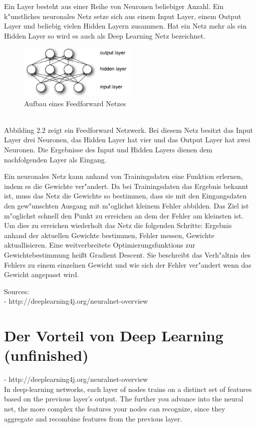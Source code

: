 {Ein Layer besteht aus einer Reihe von Neuronen beliebiger Anzahl. Ein k"unstliches neuronales Netz setze sich aus einem Input Layer, einem Output Layer und beliebig vielen Hidden Layern zusammen. Hat ein Netz mehr als ein Hidden Layer so wird es auch als Deep Learning Netz bezeichnet.
\renewcommand{\figurename}{Abb.}
\begin{figure}[htp]
\centering
\includegraphics[width=0.50\textwidth]{pictures/mlp.png}
\caption[Aufbau eines Feedforward Netzes]{Aufbau eines Feedforward Netzes\protect\footnotemark} 
\end{figure}
\\
Abbilding 2.2 zeigt ein Feedforward Netzwerk. Bei diesem Netz besitzt das Input Layer drei Neuronen, das Hidden Layer hat vier und das Output Layer hat zwei Neuronen. Die Ergebnisse des Input und Hidden Layers dienen dem nachfolgenden Layer als Eingang.


Ein neuronales Netz kann anhand von Trainingsdaten eine Funktion erlernen, indem es die Gewichte ver"andert. Da bei Trainingsdaten das Ergebnis bekannt ist, muss das Netz die Gewichte so bestimmen, dass sie mit den Eingangsdaten den gew"unschten Ausgang mit m"oglichst kleinem Fehler abbilden. Das Ziel ist m"oglichst schnell den Punkt zu erreichen an dem der Fehler am kleinsten ist. Um dies zu erreichen wiederholt das Netz die folgenden Schritte: Ergebnis anhand der aktuellen Gewichte bestimmen, Fehler messen, Gewichte aktuallisieren.
Eine weitverbreitete Optimierungsfunktions zur Gewichtebestimmung hei{\ss}t Gradient Descent. Sie beschreibt das Verh"altnis des Fehlers zu einem einzelnen Gewicht und wie sich der Fehler ver"andert wenn das Gewicht angepasst wird.

Sources:\\
- http://deeplearning4j.org/neuralnet-overview\\


\section{Der Vorteil von Deep Learning (unfinished)}
- http://deeplearning4j.org/neuralnet-overview\\
In deep-learning networks, each layer of nodes trains on a distinct set of features based on the previous layer’s output. The further you advance into the neural net, the more complex the features your nodes can recognize, since they aggregate and recombine features from the previous layer.

}
